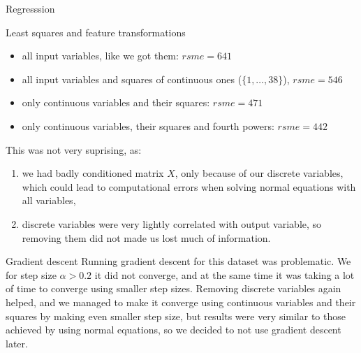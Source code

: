 \documentclass{article}
\begin{document}
\begin{section}{Regresssion}
\begin{subsection}{Least squares and feature transformations}
\begin{itemize}
\item all input variables, like we got them: $rsme=641$
\item all input variables and squares of continuous ones ($\{1, \ldots, 38\}$), $rsme = 546$
\item only continuous variables and their squares: $rsme = 471$
\item only continuous variables, their squares and fourth powers: $rsme = 442$
\end{itemize}
This was not very suprising, as:
\begin{enumerate}
\item we had badly conditioned matrix $X$, only because of our discrete variables, which could lead to computational errors when solving normal equations with all variables,
\item discrete variables were very lightly correlated with output variable, so removing them did not made us lost much of information.
\end{enumerate}
\end{subsection}
\begin{subsection}{Gradient descent}
Running gradient descent for this dataset was problematic. We for step size $\alpha > 0.2$ it did not converge, and at the same time it was taking a lot of time to converge using smaller step sizes. Removing discrete variables again helped, and we managed to make it converge using continuous variables and their squares by making even smaller step size, but results were very similar to those achieved by using normal equations, so we decided to not use gradient descent later.


\end{subsection}
\end{section}
\end{document}
